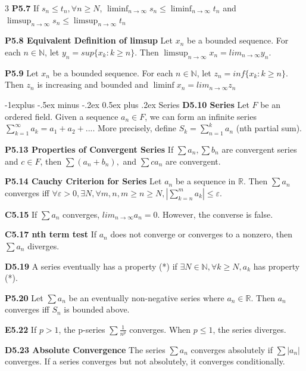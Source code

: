 \documentclass[10pt, landscape]{article}
\makeatletter
\renewcommand{\section}{\@startsection{section}{1}{0mm}%
                                {-1ex plus -.5ex minus -.2ex}%
                                {0.5ex plus .2ex}%
                                {\normalfont\large\bfseries}}
\renewcommand{\section}{\@startsection{section}{2}{0mm}%
                                {-1explus -.5ex minus -.2ex}%
                                {0.5ex plus .2ex}%
                                {\normalfont\normalsize\bfseries}}
\makeatother
\begin{document}
\begin{multicols*}{3}
\textbf{P5.7} If $s_n \leq t_n, \forall n \geq N$, $\liminf_{n\rightarrow\infty}s_n \leq\liminf_{n\rightarrow\infty}t_n$ and $\limsup_{n\rightarrow\infty}s_n \leq \limsup_{n\rightarrow\infty}t_n$

\textbf{P5.8 Equivalent Definition of limsup} Let $x_n$ be a bounded sequence. For each $n \in \mathbb{N}$, let $y_n=sup\{x_k:k\geq n\}$. Then $\limsup_{n\rightarrow\infty}x_n=lim_{n \rightarrow\infty}y_n$.

\textbf{P5.9} Let $x_n$ be a bounded sequence. For each $n \in \mathbb{N}$, let $z_n=inf\{x_k:k\geq n\}$. Then $z_n$ is increasing and bounded and $\liminf x_n=lim_{n\rightarrow\infty}z_n$

\section{Series}
\textbf{D5.10 Series} Let $F$ be an ordered field. Given a sequence $a_n\in F$, we can form an infinite series $\sum_{k=1}^\infty a_k=a_1+a_2+...$. More precisely, define $S_k=\sum_{n=1}^ka_n$ (nth partial sum).

\textbf{P5.13 Properties of Convergent Series} If $\sum a_n, \sum b_n$ are convergent series and $c \in F$, then $\sum(a_n+b_n),$ and $\sum ca_n$ are convergent.

\textbf{P5.14 Cauchy Criterion for Series} Let $a_n$ be a sequence in $\mathbb{R}$. Then $\sum a_n$ converges iff $\forall \varepsilon>0, \exists N,\forall m,n, m \geq n \geq N,|\sum_{k=n}^ma_k|\leq \varepsilon$.

\textbf{C5.15} If $\sum a_n$ converges, $lim_{n\rightarrow\infty}a_n=0$. However, the converse is false.

\textbf{C5.17 nth term test} If $a_n$ does not converge or converges to a nonzero, then $\sum a_n$ diverges.

\textbf{D5.19} A series eventually has a property (*) if $\exists N \in \mathbb{N}, \forall k \geq N, a_k$ has property (*).

\textbf{P5.20} Let $\sum a_n$ be an eventually non-negative series where $a_n \in \mathbb{R}$. Then $a_n$ converges iff $S_n$ is bounded above.

\textbf{E5.22} If $p>1$, the p-series $\sum \frac{1}{n^p}$ converges. When $p \leq 1$, the series diverges.

\textbf{D5.23 Absolute Convergence} The series $\sum a_n$ converges absolutely if $\sum |a_n|$ converges. If a series converges but not absolutely, it converges conditionally.


\end{multicols*}
\end{document}
